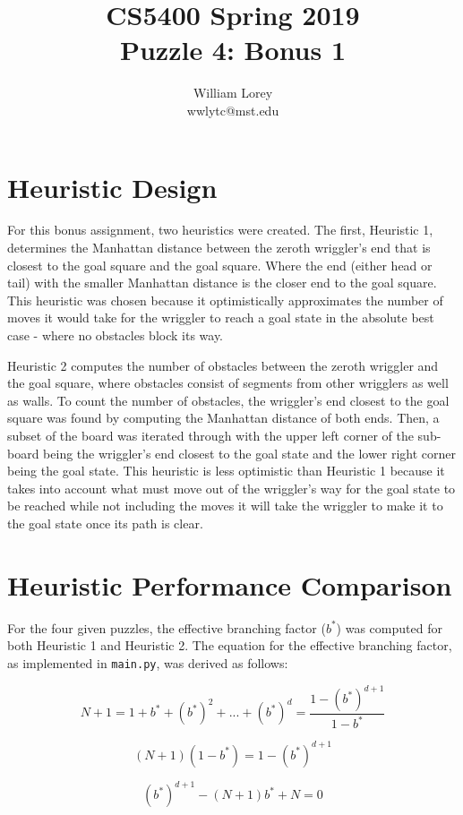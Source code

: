 \documentclass[11pt]{article}
\title{CS5400 Spring 2019 \\ Puzzle 4: Bonus 1}
\author{William  Lorey \\ wwlytc@mst.edu}
\date{}
\begin{document}
\maketitle

\tableofcontents

\section{Heuristic Design}
For this bonus assignment, two heuristics were created. The first, Heuristic 1, determines the Manhattan distance
between the zeroth wriggler's end that is closest to the goal square and the goal square. Where the end (either 
head or tail) with the smaller Manhattan distance
is the closer end to the goal square. This heuristic was chosen because it optimistically approximates the number of moves
it would take for the wriggler to reach a goal state in the absolute best case - where no obstacles block its way.

Heuristic 2 computes the number of obstacles between the zeroth wriggler and the goal square, where obstacles consist of
segments from other wrigglers as well as walls. To count the number of obstacles, the wriggler's end closest to the goal square was found
by computing the Manhattan distance of both ends. Then, a subset of the board was iterated through with the upper left corner of the sub-board
being the wriggler's end closest to the goal state and the lower right corner being the goal state. This heuristic is less optimistic
than Heuristic 1 because it takes into account what must move out of the wriggler's way for the goal state to be reached while not
including the moves it will take the wriggler to make it to the goal state once its path is clear.

\section{Heuristic Performance Comparison}

For the four given puzzles, the effective branching factor ($ b^* $) was computed for both Heuristic 1 and Heuristic 2.
The equation for the effective branching factor, as implemented in \texttt{main.py}, was derived as follows:

\[ N + 1 = 1 + b^* + (b^*)^2 + ... + (b^*)^d = \frac{1 - (b^*)^{d + 1}}{1 - b^*} \]

\[ (N + 1)(1 - b^*) = 1 - (b^*)^{d + 1} \]

\[ (b^*)^{d + 1} - (N + 1)b^* + N = 0 \]
\end{document}
